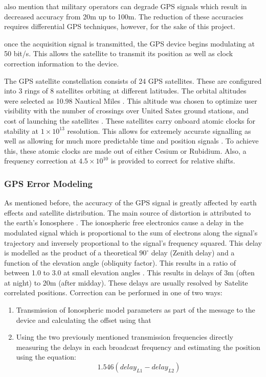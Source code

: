 \textcite{spilker1996global} also mention that military operators can degrade GPS signals which result in decreased accuracy from 20m up to 100m. The reduction of these accuracies requires differential GPS techniques, however, for the sake of this project. \par
once the acquisition signal is transmitted, the GPS device begins modulating at 50 bit/s. This allows the satellite to transmit its position as well as clock correction information to the device.\par
The GPS satellite constellation consists of 24 GPS satellites. These are configured into 3 rings of 8 satellites orbiting at different latitudes. The orbital altitudes were selected as 10.98 Nautical Miles \cite{spilker1996global}. This altitude was chosen to optimize user visibility with the number of crossings over United Sates ground stations, and cost of launching the satellites \cite{spilker1996global}. These satellites carry onboard atomic clocks for stability at $1\times10^{13}$ resolution. This allows for extremely accurate signalling as well as allowing for much more predictable time and position signals \cite{spilker1996global}. To achieve this, these atomic clocks are made out of either Cesium or Rubidium. Also, a frequency correction at $4.5\times10^{10}$ is provided to correct for relative shifts. \par
\subsubsection{GPS Error Modeling}
As mentioned before, the accuracy of the GPS signal is greatly affected by earth effects and satellite distribution. The main source of distortion is attributed to the earth's Ionosphere \cite{spilker1996global}. The ionospheric free electronics cause a delay in the modulated signal which is proportional to the sum of electrons along the signal's trajectory and inversely proportional to the signal's frequency squared. This delay is modelled as the product of a theoretical $90^\circ$ delay (Zenith delay) and a function of the elevation angle (obliquity factor). This results in a ratio of between 1.0 to 3.0 at small elevation angles \cite{spilker1996global}. This results in delays of 3m (often at night) to 20m (after midday). These delays are usually resolved by Satelite correlated positions. Correction can be performed in one of two ways:
\begin{enumerate}
    \item Transmission of Ionospheric model parameters as part of the message to the device and calculating the offset using that
    \item Using the two previously mentioned transmission frequencies directly measuring the delays in each broadcast frequency and estimating the position using the equation:\cite{spilker1996global}
    \begin{equation}
        1.546(delay_{L1} - delay_{L2})
    \end{equation}
\end{enumerate}

